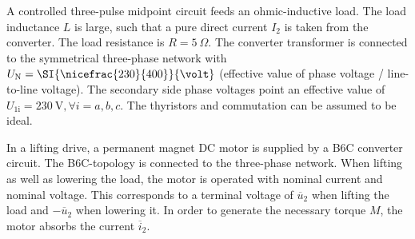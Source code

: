 

A controlled three-pulse midpoint circuit feeds an ohmic-inductive load. The load inductance $L$ is large, such that a pure direct current $I_\mathrm{2}$ is taken from the converter. The load resistance is $R = \SI{5}{\Omega}$. The converter transformer 
is connected to the symmetrical three-phase network with $U_\mathrm{N} = \SI{\nicefrac{230}{400}}{\volt} $ (effective value of phase voltage / line-to-line voltage). The secondary side phase voltages point an effective value of 
$U_\mathrm{1i} = \SI{230}{\volt}, \forall i=a,b,c$. The thyristors and commutation can be assumed to be ideal.






In a lifting drive, a permanent magnet DC motor is supplied by a B6C converter circuit. The B6C-topology is connected to the three-phase network.
When lifting as well as lowering the load, the motor is operated with nominal current and nominal voltage. 
This corresponds to a terminal voltage of $\overline{u}_\mathrm{2}$ when lifting the load and $-\overline{u}_\mathrm{2}$ when lowering it.
In order to generate the necessary torque $M$, the motor absorbs the current $\overline{i}_\mathrm{2}$.

